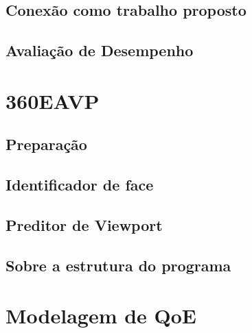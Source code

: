 \subsection{Conexão como trabalho proposto}
\subsection{Avaliação de Desempenho}


\section{360EAVP}
\subsection{Preparação}
\subsection{Identificador de face}
\subsection{Preditor de Viewport}
\subsection{Sobre a estrutura do programa}

\section{Modelagem de QoE}

